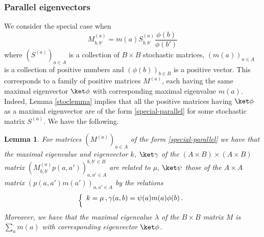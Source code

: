 \documentclass[reqno]{amsart}
\theoremstyle{plain}
\newtheorem{lemma}[theorem]{Lemma}
\theoremstyle{definition}
\theoremstyle{remark}
\numberwithin{equation}{section}
\numberwithin{theorem}{section}
\def\\{\par\medskip}
\newcommand{\<}{\langle}
\renewcommand{\>}{\rangle}
\begin{document}
	\subsubsection{Parallel eigenvectors}
	We consider the special case when 
	\begin{equation}\label{special-parallel}
		M^{(a)}_{b,b'}=m(a)S^{(a)}_{b,b'}\frac{\phi(b)}{\phi(b')}
	\end{equation}
	where $(S^{(a)})_{a\in A}$ is a collection of $B\times B$ stochastic matrices, $(m(a))_{a\in A}$ is a collection of positive numbers and $(\phi(b))_{b\in B}$ is a positive vector. This corresponds to a family of positive matrices $M^{(a)}$, each having the same maximal eigenvector $\ket \phi$ with corresponding maximal eigenvalue $m(a)$. Indeed, Lemma \ref{stoclemma} implies that all the positive matrices having $\ket \phi$ as a maximal eigenvector are of the form \eqref{special-parallel} for some stochastic matrix $S^{(a)}$. We have the following.
	\begin{lemma}\label{poilotogliamo}
		For matrices $(M^{(a)})_{a\in A}$ of the form \eqref{special-parallel} we have that the maximal eigenvalue and eigenvector $k$, $\ket \gamma$ of the $(A\times B)\times (A\times B)$ matrix $\left(M^{(a)}_{b,b'}p(a,a')\right)_{a,a'\in A}^{b,b'\in B}$ are related to $\mu$, $\ket \psi$ those of the $A\times A$ matrix $\left(p(a,a')m(a')\right)_{a,a'\in A}$ by the relations 
		\begin{equation}
			\left\{
			\begin{array}{l}
				k=\mu\,, \\
				\gamma(a,b)=\psi(a)m(a)\phi(b)\,.
			\end{array}
			\right.
		\end{equation}
		Moreover, we have that the maximal eigenvalue $\lambda$ of the $B\times B$ matrix $M$ is $\sum_am(a)$ with corresponding eigenvector $\ket \phi$.
	\end{lemma}
	
\end{document}
